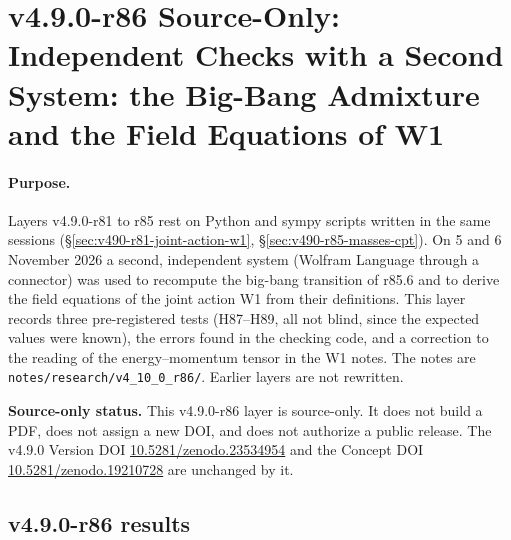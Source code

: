 \clearpage
\section*{v4.9.0-r86 Source-Only: Independent Checks with a Second System: the Big-Bang Admixture and the Field Equations of W1}
\label{sec:v490-r86-wolfram-checks}

\paragraph{Purpose.}
Layers v4.9.0-r81 to r85 rest on Python and sympy scripts written in the same sessions (\S\ref{sec:v490-r81-joint-action-w1},
\S\ref{sec:v490-r85-masses-cpt}).  On 5 and 6 November 2026 a second, independent system (Wolfram Language through a connector) was used to
recompute the big-bang transition of r85.6 and to derive the field equations of the joint action W1 from their definitions.  This layer records
three pre-registered tests (H87--H89, all not blind, since the expected values were known), the errors found in the checking code, and a
correction to the reading of the energy--momentum tensor in the W1 notes.  The notes are
\texttt{notes/\allowbreak research/\allowbreak v4\_10\_0\_r86/}.  Earlier layers are not rewritten.

\noindent\textbf{Source-only status.}
This v4.9.0-r86 layer is source-only.  It does not build a PDF, does not assign a new DOI,
and does not authorize a public release.  The v4.9.0 Version DOI
\href{https://doi.org/10.5281/zenodo.23534954}{10.5281/zenodo.23534954} and the Concept DOI
\href{https://doi.org/10.5281/zenodo.19210728}{10.5281/zenodo.19210728} are unchanged by it.

\subsection*{v4.9.0-r86 results}
\label{subsec:v490-r86-results}

